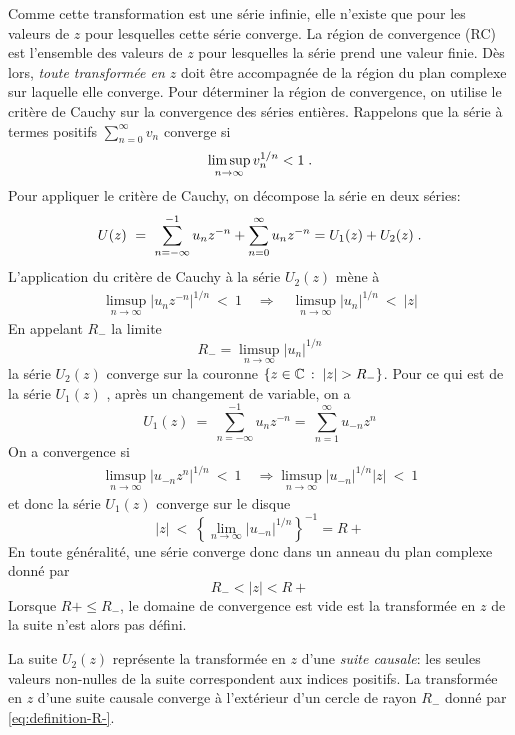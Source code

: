 Comme cette transformation est une s\'{e}rie infinie, elle n'existe que pour les valeurs de $z$ pour lesquelles cette s\'{e}rie converge. La r\'{e}gion de convergence (RC) est l'ensemble des valeurs de $z$ pour lesquelles la s\'{e}rie prend une valeur finie. Dès lors, \emph{toute transform\'{e}e en $z$} doit \^{e}tre accompagnée de la région du plan complexe sur laquelle elle converge. Pour d\'{e}terminer la r\'{e}gion de convergence, on utilise le crit\`{e}re de Cauchy sur la convergence des s\'{e}ries entières. Rappelons que la s\'{e}rie à termes positifs
$ \sum_{n=0}^{\infty} v_n$ converge si
\begin{equation}
\label{eq:critere-cauchy}
\limsup_{n\rightarrow\infty} v_{n}^{1/n}<1 \;.
\end{equation}
Pour appliquer le crit\`{e}re de Cauchy, on d\'{e}compose la s\'{e}rie en deux s\'{e}ries:
$$
U(z)\ =\ \sum_{n=-\infty}^{-1} u_n z^{-n}+\sum_{n=0}^{\infty} u_n z^{-n} = U_1(z) + U_2(z) \;.
$$
L'application du crit\`{e}re de Cauchy \`{a} la s\'{e}rie $U_{2}(z)$ m\`{e}ne \`{a}
\begin{align*}
\limsup_{n\rightarrow\infty}| u_n z^{-n}|^{1/n}\ <\ 1  \quad \Rightarrow \quad
\limsup_{n\rightarrow\infty}| u_n |^{1/n}\ <\ |z|
\end{align*}
En appelant $R_{-}$ la limite
\begin{equation}
\label{eq:definition-R-}
R_{-}=\limsup_{n\rightarrow\infty}|u_n|^{1/n}
\end{equation}
la s\'{e}rie $U_{2}(z)$ converge sur la couronne $\ensemble{z \in \cset}{|z|>R_{-}}$.
Pour ce qui est de la s\'{e}rie $U_{1}(z)$ , apr\`{e}s un changement de variable, on a
$$
U_{1}(z)\ =\ \sum_{n=-\infty}^{-1} u_n z^{-n} =\ \sum_{n=1}^{\infty} u_{-n} z^{n}
$$
On a convergence si
\begin{align*}
\limsup_{n\rightarrow\infty}|u_{-n} z^{n}|^{1/n}\ <\ 1 \quad \Rightarrow \limsup_{n\rightarrow\infty}|u_{-n}|^{1/n}|z|\ <\ 1
\end{align*}
et donc la série $U_1(z)$ converge sur le disque
\begin{equation}
\label{eq:definition-R+}
|z|\ <\ \left\{ \lim_{n\rightarrow\infty}|u_{-n}|^{1/n} \right\}^{-1}=R+
\end{equation}
En toute g\'{e}n\'{e}ralit\'{e}, une s\'{e}rie converge donc  dans un anneau du plan complexe  donn\'{e} par
$$
R_{-}<|z|<R+
$$
Lorsque $R+\leq R_{-}$, le domaine de convergence est vide est la transformée en $z$ de la suite n'est alors pas défini.

La suite $U_{2}(z)$ repr\'{e}sente la transform\'{e}e en $z$ d'une \emph{suite causale}: les seules valeurs non-nulles de la suite
correspondent aux indices positifs. La transformée en $z$ d'une suite causale converge \`{a} l'ext\'{e}rieur d'un cercle de rayon $R_{-}$ donn\'{e} par \eqref{eq:definition-R-}.

